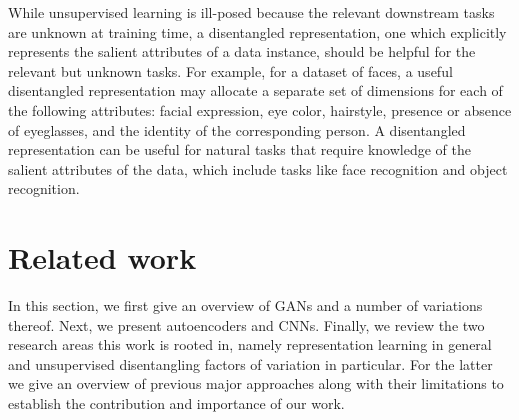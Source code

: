 \documentclass[12pt,a4paper]{article}
\begin{document}
While unsupervised learning is ill-posed because the relevant downstream tasks are unknown at training time, a disentangled representation, one which explicitly represents the salient attributes of a data instance, should be helpful for the relevant but unknown tasks. For example, for a dataset of faces, a useful disentangled representation may allocate a separate set of dimensions for each of the following attributes: facial expression, eye color, hairstyle, presence or absence of eyeglasses, and the identity of the corresponding person. A disentangled representation can be useful for natural tasks that require knowledge of the salient attributes of the data, which include tasks like face recognition and object recognition.

\section{Related work}
In this section, we first give an overview of GANs and a number of variations thereof. Next, we present autoencoders and CNNs. Finally, we review the two research areas this work is rooted in, namely representation learning in general and unsupervised disentangling factors of variation in particular. For the latter we give an overview of previous major approaches along with their limitations to establish the contribution and importance of our work.
\end{document}
